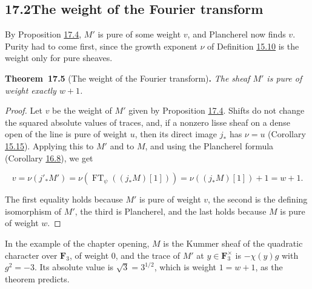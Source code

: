 \documentclass[11pt]{article}
\newenvironment{bpstatement}[2]{\par\addvspace{0.6\baselineskip}\noindent\textbf{#1}#2\textbf{.}\enspace\ignorespaces}
  {\par\addvspace{0.4\baselineskip}}
\newenvironment{bpstatementit}[2]{\begin{bpstatement}{#1}{#2}\itshape\ignorespaces}{\end{bpstatement}}
\begin{document}
\subsection*{\texorpdfstring{17.2\quad The weight of the Fourier transform}{17.2 The weight of the Fourier transform}}
\label{bp236}%
\label{bp237}%
By Proposition \hyperref[bp234]{17.4}, \(M'\) is pure of some weight \(v\), and Plancherel now finds \(v\). Purity had to come first, since the growth exponent \(\nu\) of Definition \hyperref[bp151]{15.10} is the weight only for pure sheaves.

\label{bp238}%
\begin{bpstatementit}{Theorem~17.5}{ (The weight of the Fourier transform)}
The sheaf \(M'\) is pure of weight exactly \(w+1\).
\end{bpstatementit}

\begin{proof}[{Proof}]\label{bp239}%
Let \(v\) be the weight of \(M'\) given by Proposition \hyperref[bp234]{17.4}. Shifts do not change the squared absolute values of traces, and, if a nonzero lisse sheaf on a dense open of the line is pure of weight \(u\), then its direct image \(j_*\) has \(\nu=u\) (Corollary \hyperref[bp165]{15.15}). Applying this to \(M'\) and to \(M\), and using the Plancherel formula (Corollary \hyperref[bp192]{16.8}), we get

\[
v=\nu(j'_*M')
=\nu(\operatorname{FT}_\psi((j_*M)[1]))
=\nu((j_*M)[1])+1=w+1.
\]

The first equality holds because \(M'\) is pure of weight \(v\), the second is the defining isomorphism of \(M'\), the third is Plancherel, and the last holds because \(M\) is pure of weight \(w\).
\end{proof}

\label{bp240}%
In the example of the chapter opening, \(M\) is the Kummer sheaf of the quadratic character over \(\mathbf F_3\), of weight \(0\), and the trace of \(M'\) at \(y\in\mathbf F_3^\times\) is \(-\chi(y)g\) with \(g^2=-3\). Its absolute value is \(\sqrt3=3^{1/2}\), which is weight \(1=w+1\), as the theorem predicts.
\end{document}

